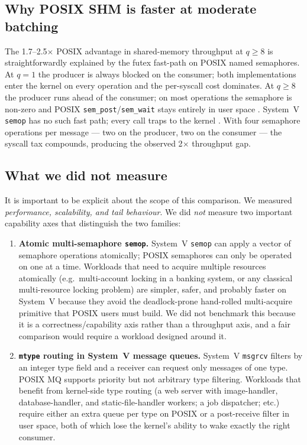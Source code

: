 \documentclass[a4paper,11pt]{article}
\begin{document}
\subsection{Why POSIX SHM is faster at moderate batching}
\label{sec:disc:shm}

The 1.7--2.5$\times$ POSIX advantage in shared-memory throughput at
$q\geq 8$ is straightforwardly explained by the futex fast-path on
POSIX named semaphores. At $q=1$ the producer is always blocked on the
consumer; both implementations enter the kernel on every operation and
the per-syscall cost dominates. At $q\geq 8$ the producer runs ahead
of the consumer; on most operations the semaphore is non-zero and
POSIX \texttt{sem\_post}/\texttt{sem\_wait} stays entirely in user
space \cite{drepper2011futexes}. System~V \texttt{semop} has no such
fast path; every call traps to the kernel \cite{linux_sysvipc}. With
four semaphore operations per message --- two on the producer, two on
the consumer --- the syscall tax compounds, producing the observed
2$\times$ throughput gap.

\subsection{What we did not measure}
\label{sec:disc:not_measured}

It is important to be explicit about the scope of this comparison. We
measured \emph{performance, scalability, and tail behaviour}. We did
\emph{not} measure two important capability axes that distinguish the
two families:

\begin{enumerate}[leftmargin=*]
\item \textbf{Atomic multi-semaphore \texttt{semop}.} System~V
\texttt{semop} can apply a vector of semaphore operations atomically;
POSIX semaphores can only be operated on one at a time. Workloads that
need to acquire multiple resources atomically (e.g.\ multi-account
locking in a banking system, or any classical multi-resource locking
problem) are simpler, safer, and probably faster on System~V because
they avoid the deadlock-prone hand-rolled multi-acquire primitive that
POSIX users must build. We did not benchmark this because it is a
correctness/capability axis rather than a throughput axis, and a fair
comparison would require a workload designed around it.
\item \textbf{\texttt{mtype} routing in System~V message queues.}
System~V \texttt{msgrcv} filters by an integer type field and a
receiver can request only messages of one type. POSIX MQ supports
priority but not arbitrary type filtering. Workloads that benefit
from kernel-side type routing (a web server with image-handler,
database-handler, and static-file-handler workers; a job dispatcher;
etc.) require either an extra queue per type on POSIX or a post-receive
filter in user space, both of which lose the kernel's ability to wake
exactly the right consumer.
\end{enumerate}
\end{document}
